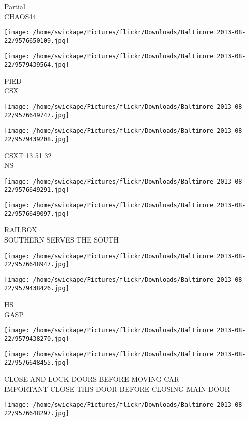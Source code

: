\documentclass[10pt,letterpaper]{article}
\begin{document}
Partial\\
CHAOS44
\pagebreak

\texttt{[image: /home/swickape/Pictures/flickr/Downloads/Baltimore 2013-08-22/9576650109.jpg]}

\vspace{0.25in}
\texttt{[image: /home/swickape/Pictures/flickr/Downloads/Baltimore 2013-08-22/9579439564.jpg]}

PIED\\
CSX
\pagebreak

\texttt{[image: /home/swickape/Pictures/flickr/Downloads/Baltimore 2013-08-22/9576649747.jpg]}

\vspace{0.25in}
\texttt{[image: /home/swickape/Pictures/flickr/Downloads/Baltimore 2013-08-22/9579439208.jpg]}

CSXT 13 51 32\\
NS
\pagebreak

\texttt{[image: /home/swickape/Pictures/flickr/Downloads/Baltimore 2013-08-22/9576649291.jpg]}

\vspace{0.25in}
\texttt{[image: /home/swickape/Pictures/flickr/Downloads/Baltimore 2013-08-22/9576649097.jpg]}

RAILBOX\\
SOUTHERN SERVES THE SOUTH
\pagebreak

\texttt{[image: /home/swickape/Pictures/flickr/Downloads/Baltimore 2013-08-22/9576648947.jpg]}

\vspace{0.25in}
\texttt{[image: /home/swickape/Pictures/flickr/Downloads/Baltimore 2013-08-22/9579438426.jpg]}

HS\\
GASP
\pagebreak

\texttt{[image: /home/swickape/Pictures/flickr/Downloads/Baltimore 2013-08-22/9579438270.jpg]}

\vspace{0.25in}
\texttt{[image: /home/swickape/Pictures/flickr/Downloads/Baltimore 2013-08-22/9576648455.jpg]}

CLOSE AND LOCK DOORS BEFORE MOVING CAR\\
IMPORTANT CLOSE THIS DOOR BEFORE CLOSING MAIN DOOR
\pagebreak

\texttt{[image: /home/swickape/Pictures/flickr/Downloads/Baltimore 2013-08-22/9576648297.jpg]}
\end{document}
